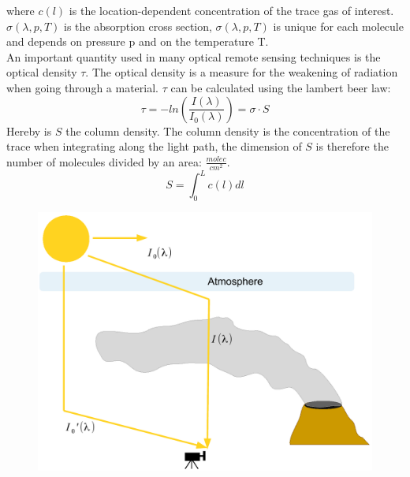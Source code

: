 \documentclass  [
  paper    = a4,
  BCOR     = 10mm,
  twoside,
  fontsize = 12pt,
  fleqn,
  toc      = bibnumbered,
  toc      = listofnumbered,
  numbers  = noendperiod,
  headings = normal,
  listof   = leveldown,
  version  = 3.03
]                                       {scrreprt}
\begin{document}
	where $c\left(l\right)$ is the location-dependent concentration of the trace gas of interest. $\sigma\left(\lambda,p,T\right)$ is the absorption cross section, $\sigma\left(\lambda,p,T\right)$ is unique for each molecule and depends on pressure p and on the temperature T.\\
	An important quantity used in many optical remote sensing techniques is the optical density $\tau$. The optical density is a measure for the weakening of radiation when going through a material. $\tau$ can be calculated using the lambert beer law:
	\begin{equation}
	\tau = -ln\left(\frac{I\left(\lambda\right)}{I_{0}\left(\lambda\right)}\right) = \sigma\cdot S
	\end{equation}
	Hereby is $S$ the column density. The column density is the concentration of the trace when integrating along the light path, the dimension of $S$ is therefore the number of molecules divided by an area: $\frac{molec}{cm^2}$.
	\begin{equation}
	S = \int_{0}^{L}c\left(l\right)dl
	\end{equation}
	\begin{figure}
		\centering
		\includegraphics[width=0.9\linewidth]{Bilder/DOASFunction}
		\caption{}
		\label{fig:doasfunction}
	\end{figure}
	
\end{document}
